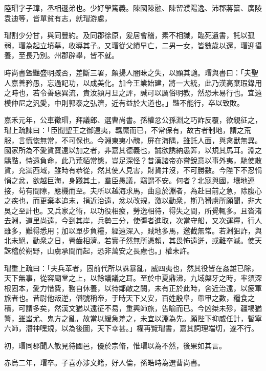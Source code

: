 \begin{pinyinscope}
 
 
 陸瑁字子璋，丞相遜弟也。少好學篤義。陳國陳融、陳留濮陽逸、沛郡蔣纂、廣陵袁迪等，皆單貧有志，就瑁游處，
 
 
 瑁割少分甘，與同豐約。及同郡徐原，爰居會稽，素不相識，臨死遺書，託以孤弱，瑁為起立墳墓，收導其子。又瑁從父績早亡，二男一女，皆數歲以還，瑁迎攝養，至長乃別。州郡辟舉，皆不就。
 
 
 
 
 時尚書曁豔盛明臧否，差斷三署，頗揚人闇昧之失，以顯其讁。瑁與書曰：「夫聖人嘉善矜愚，忘過記功，以成美化。加今王業始建，將一大統，此乃漢高棄瑕錄用之時也，若令善惡異流，貴汝潁月旦之評，誠可以厲俗明教，然恐未易行也。宜遠模仲尼之汎愛，中則郭泰之弘濟，近有益於大道也。」豔不能行，卒以致敗。
 
 
 
 
 嘉禾元年，公車徵瑁，拜議郎、選曹尚書。孫權忿公孫淵之巧詐反覆，欲親征之，瑁上疏諫曰：「臣聞聖王之御遠夷，羈縻而已，不常保有，故古者制地，謂之荒服，言慌惚無常，不可保也。今淵東夷小醜，屏在海隅，雖託人面，與禽獸無異。國家所為不愛貨寶遠以加之者，非嘉其德義也，誠欲誘納愚筭，以規其馬耳。淵之驕黠，恃遠負命，此乃荒貊常態，豈足深怪？昔漢諸帝亦嘗銳意以事外夷，馳使散貨，充滿西域，雖時有恭從，然其使人見害，財貨并沒，不可勝數。今陛下不忍悁悁之忿，欲越巨海，身踐其土，羣臣愚議，竊謂不安。何者？北寇與國，壤地連接，苟有間隙，應機而至。夫所以越海求馬，曲意於淵者，為赴目前之急，除腹心之疾也，而更棄本追末，捐近治遠，忿以改規，激以動衆，斯乃猾虜所願聞，非大吳之至計也。又兵家之術，以功役相疲，勞逸相待，得失之間，所覺輒多。且沓渚去淵，道里尚遠，今到其岸，兵勢三分，使彊者進取，次當守船，又次運糧，行人雖多，難得悉用；加以單步負糧，經遠深入，賊地多馬，邀截無常。若淵狙詐，與北未絕，動衆之日，脣齒相濟。若實孑然無所憑賴，其畏怖遠迸，或難卒滅。使天誅稽於朔野，山虜承間而起，恐非萬安之長慮也。」權未許。
 
 
 
 
 瑁重上疏曰：「夫兵革者，固前代所以誅暴亂，威四夷也，然其役皆在姦雄已除，天下無事，從容廟堂之上，以餘議議之耳。至於中夏鼎沸，九域槃牙之時，率須深根固本，愛力惜費，務自休養，以待鄰敵之闕，未有正於此時，舍近治遠，以疲軍旅者也。昔尉他叛逆，僭號稱帝，于時天下乂安，百姓殷阜，帶甲之數，糧食之積，可謂多矣，然漢文猶以遠征不易，重興師旅，告喻而已。今凶桀未殄，疆埸猶警，雖蚩尤、鬼方之亂，故當以緩急差之，未宜以淵為先。願陛下抑威任計，暫寧六師，潛神嘿規，以為後圖，天下幸甚。」權再覽瑁書，嘉其詞理端切，遂不行。
 
 
 
 
 初，瑁同郡聞人敏見待國邑，優於宗脩，惟瑁以為不然，後果如其言。
 
 
赤烏二年，瑁卒。子喜亦涉文籍，好人倫，孫皓時為選曹尚書。
 
 
\end{pinyinscope}